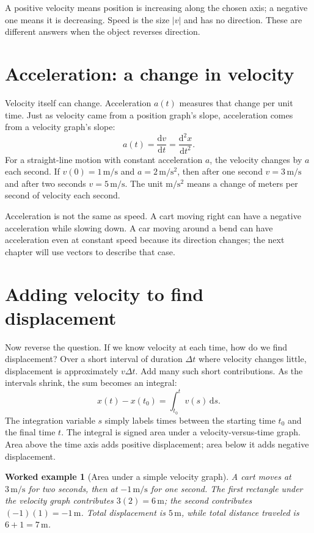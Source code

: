 \documentclass[11pt,oneside]{book}
\newcommand{\dd}{\mathrm{d}}
\newcommand{\od}[2]{\frac{\dd #1}{\dd #2}}
\theoremstyle{reviewstyle}
\newtheorem{example}{Worked example}[chapter]
\begin{document}
A positive velocity means position is increasing along the chosen axis; a negative one means it is decreasing. Speed is the size $|v|$ and has no direction. These are different answers when the object reverses direction.

\section{Acceleration: a change in velocity}
Velocity itself can change. Acceleration $a(t)$ measures that change per unit time. Just as velocity came from a position graph's slope, acceleration comes from a velocity graph's slope:
\begin{equation}
a(t)=\od{v}{t}=\frac{\dd^2x}{\dd t^2}.
\end{equation}
For a straight-line motion with constant acceleration $a$, the velocity changes by $a$ each second. If $v(0)=1\,\mathrm{m/s}$ and $a=2\,\mathrm{m/s^2}$, then after one second $v=3\,\mathrm{m/s}$ and after two seconds $v=5\,\mathrm{m/s}$. The unit $\mathrm{m/s^2}$ means a change of meters per second of velocity each second.

Acceleration is not the same as speed. A cart moving right can have a negative acceleration while slowing down. A car moving around a bend can have acceleration even at constant speed because its direction changes; the next chapter will use vectors to describe that case.

\section{Adding velocity to find displacement}
Now reverse the question. If we know velocity at each time, how do we find displacement? Over a short interval of duration $\Delta t$ where velocity changes little, displacement is approximately $v\Delta t$. Add many such short contributions. As the intervals shrink, the sum becomes an integral:
\begin{equation}
x(t)-x(t_0)=\int_{t_0}^{t}v(s)\,\dd s.
\end{equation}
The integration variable $s$ simply labels times between the starting time $t_0$ and the final time $t$. The integral is signed area under a velocity-versus-time graph. Area above the time axis adds positive displacement; area below it adds negative displacement.

\begin{example}[Area under a simple velocity graph]
A cart moves at $3\,\mathrm{m/s}$ for two seconds, then at $-1\,\mathrm{m/s}$ for one second. The first rectangle under the velocity graph contributes $3(2)=6\,\mathrm m$; the second contributes $(-1)(1)=-1\,\mathrm m$. Total displacement is $5\,\mathrm m$, while total distance traveled is $6+1=7\,\mathrm m$.
\end{example}
\end{document}
